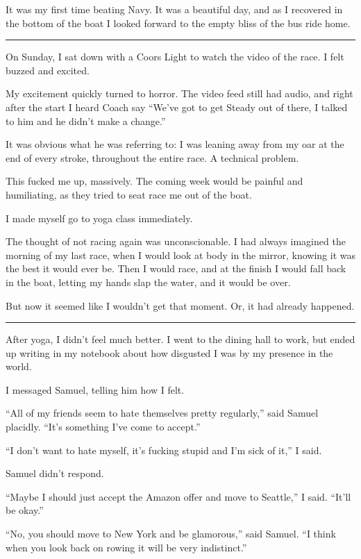 It was my first time beating Navy.  It was a beautiful day, and as I recovered
in the bottom of the boat I looked forward to the empty bliss of the bus ride
home.

\plainfancybreak{12pt}{2}{}

On Sunday, I sat down with a Coors Light to watch the video of the race.  I felt
buzzed and excited. 

My excitement quickly turned to horror.  The video feed still had audio, and
right after the start I heard Coach say ``We've got to get Steady out of there,
I talked to him and he didn't make a change.''  

It was obvious what he was referring to: I was leaning away from my oar at the
end of every stroke, throughout the entire race.  A technical problem.

This fucked me up, massively.  The coming week would be painful and humiliating,
as they tried to seat race me out of the boat.

I made myself go to yoga class immediately.  

The thought of not racing again was unconscionable.  I had always imagined the
morning of my last race, when I would look at body in the mirror, knowing it was
the best it would ever be.  Then I would race, and at the finish I would fall
back in the boat, letting my hands slap the water, and it would be over.

But now it seemed like I wouldn't get that moment.  Or, it had already happened.

\plainfancybreak{12pt}{2}{}

After yoga, I didn't feel much better.  I went to the dining hall to work, but
ended up writing in my notebook about how disgusted I was by my presence in the
world.

I messaged Samuel, telling him how I felt.

``All of my friends seem to hate themselves pretty regularly,'' said Samuel
placidly.  ``It's something I've come to accept.''

``I don't want to hate myself, it's fucking stupid and I'm sick of it,'' I said.  

Samuel didn't respond.

``Maybe I should just accept the Amazon offer and move to Seattle,'' I said.
``It'll be okay.''

``No, you should move to New York and be glamorous,'' said Samuel.  ``I think
when you look back on rowing it will be very indistinct.'' 

